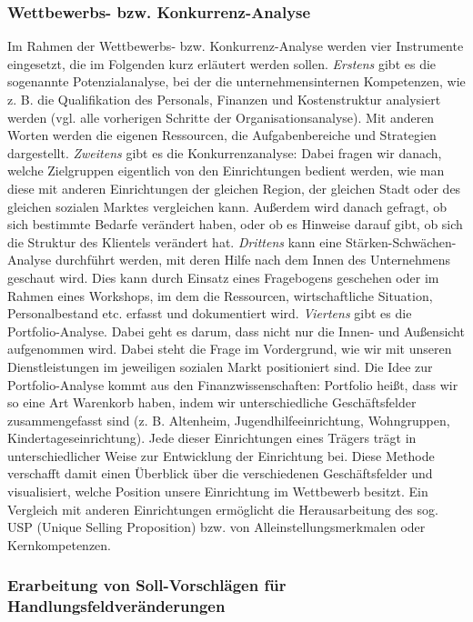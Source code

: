 \documentclass[
  letterpaper,
]{book}
\begin{document}
\subsubsection{Wettbewerbs- bzw.
Konkurrenz-Analyse}\label{wettbewerbs--bzw.-konkurrenz-analyse}

Im Rahmen der Wettbewerbs- bzw. Konkurrenz-Analyse werden vier
Instrumente eingesetzt, die im Folgenden kurz erläutert werden sollen.
\emph{Erstens} gibt es die sogenannte Potenzialanalyse, bei der die
unternehmensinternen Kompetenzen, wie z. B. die Qualifikation des
Personals, Finanzen und Kostenstruktur analysiert werden (vgl. alle
vorherigen Schritte der Organisationsanalyse). Mit anderen Worten werden
die eigenen Ressourcen, die Aufgabenbereiche und Strategien dargestellt.
\emph{Zweitens} gibt es die Konkurrenzanalyse: Dabei fragen wir danach,
welche Zielgruppen eigentlich von den Einrichtungen bedient werden, wie
man diese mit anderen Einrichtungen der gleichen Region, der gleichen
Stadt oder des gleichen sozialen Marktes vergleichen kann. Außerdem wird
danach gefragt, ob sich bestimmte Bedarfe verändert haben, oder ob es
Hinweise darauf gibt, ob sich die Struktur des Klientels verändert hat.
\emph{Drittens} kann eine Stärken-Schwächen-Analyse durchführt werden,
mit deren Hilfe nach dem Innen des Unternehmens geschaut wird. Dies kann
durch Einsatz eines Fragebogens geschehen oder im Rahmen eines
Workshops, im dem die Ressourcen, wirtschaftliche Situation,
Personalbestand etc. erfasst und dokumentiert wird. \emph{Viertens} gibt
es die Portfolio-Analyse. Dabei geht es darum, dass nicht nur die Innen-
und Außensicht aufgenommen wird. Dabei steht die Frage im Vordergrund,
wie wir mit unseren Dienstleistungen im jeweiligen sozialen Markt
positioniert sind. Die Idee zur Portfolio-Analyse kommt aus den
Finanzwissenschaften: Portfolio heißt, dass wir so eine Art Warenkorb
haben, indem wir unterschiedliche Geschäftsfelder zusammengefasst sind
(z. B. Altenheim, Jugendhilfeeinrichtung, Wohngruppen,
Kindertageseinrichtung). Jede dieser Einrichtungen eines Trägers trägt
in unterschiedlicher Weise zur Entwicklung der Einrichtung bei. Diese
Methode verschafft damit einen Überblick über die verschiedenen
Geschäftsfelder und visualisiert, welche Position unsere Einrichtung im
Wettbewerb besitzt. Ein Vergleich mit anderen Einrichtungen ermöglicht
die Herausarbeitung des sog. USP (Unique Selling Proposition) bzw. von
Alleinstellungsmerkmalen oder Kernkompetenzen.

\subsubsection{Erarbeitung von Soll-Vorschlägen für
Handlungsfeldveränderungen}\label{erarbeitung-von-soll-vorschluxe4gen-fuxfcr-handlungsfeldveruxe4nderungen}
\end{document}
